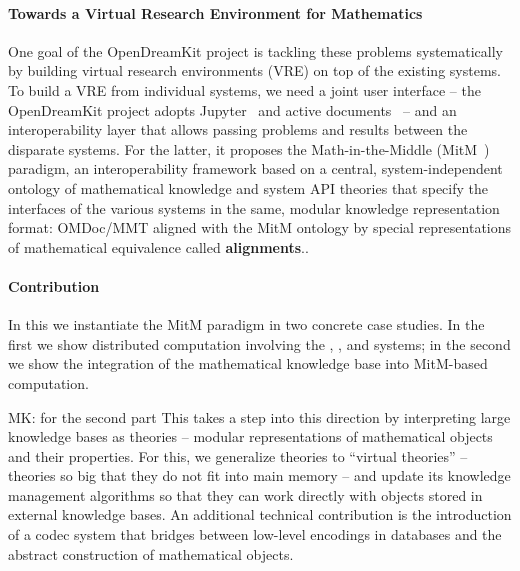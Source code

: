 
\paragraph{Towards a Virtual Research Environment for Mathematics} One goal of the OpenDreamKit project is tackling these problems systematically by building virtual research environments (VRE) on top of the existing systems.  To build a VRE from individual systems, we need a joint user interface -- the OpenDreamKit project adopts Jupyter~\cite{jupyter-project:on} and active documents~\cite{KohDavGin:psewads11} -- and an interoperability layer that allows passing problems and results between the disparate systems.  For the latter, it proposes the Math-in-the-Middle (MitM~\cite{DehKohKon:iop16}) paradigm, an interoperability framework based on a central, system-independent ontology of mathematical knowledge and system API theories that specify the interfaces of the various systems in the same, modular knowledge representation format: OMDoc/MMT aligned with the MitM ontology by special representations of mathematical equivalence called \textbf{alignments}..

\paragraph{Contribution}
In this \papertype we instantiate the MitM paradigm in two concrete case studies. In the first we show distributed computation involving the \GAP, \Sage, and \Singular systems; in the second we show the integration of the mathematical knowledge base \LMFDB into MitM-based computation.

\begin{newpart}{MK: for the second part}
    This \papertype takes a step into this direction by interpreting large knowledge bases as \ommt theories -- modular representations of mathematical objects and their properties. 
  For this, we generalize \ommt theories to ``virtual theories'' -- theories so big that they do not fit into main memory -- and update its knowledge management algorithms so that they can work directly with objects stored in external knowledge bases.
  An additional technical contribution is the introduction of a codec system that bridges between low-level encodings in databases and the abstract construction of mathematical objects.
\end{newpart}

